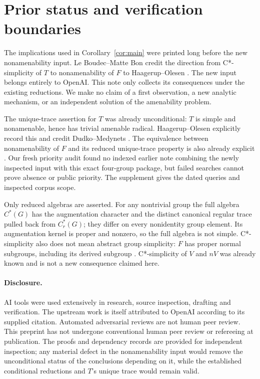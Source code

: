 \documentclass[11pt]{article}
\newcommand{\Cr}{C^*_r}
\begin{document}
\section{Prior status and verification boundaries}
The implications used in Corollary~\ref{cor:main} were printed long before the new nonamenability input. Le Boudec--Matte Bon credit the direction from C*-simplicity of $T$ to nonamenability of $F$ to Haagerup--Olesen \cite[Theorem~5.5]{HO}. The new input belongs entirely to OpenAI. This note only collects its consequences under the existing reductions. We make no claim of a first observation, a new analytic mechanism, or an independent solution of the amenability problem.

The unique-trace assertion for $T$ was already unconditional: $T$ is simple and nonamenable, hence has trivial amenable radical. Haagerup--Olesen explicitly record this and credit Dudko--Medynets \cite[discussion after Theorem~5.5]{HO}. The equivalence between nonamenability of $F$ and its reduced unique-trace property is also already explicit \cite[Remark~5.6]{HO}. Our fresh priority audit found no indexed earlier note combining the newly inspected input with this exact four-group package, but failed searches cannot prove absence or public priority. The supplement gives the dated queries and inspected corpus scope.

Only reduced algebras are asserted. For any nontrivial group the full algebra $C^*(G)$ has the augmentation character and the distinct canonical regular trace pulled back from $\Cr(G)$; they differ on every nonidentity group element. Its augmentation kernel is proper and nonzero, so the full algebra is not simple. C*-simplicity also does not mean abstract group simplicity: $F$ has proper normal subgroups, including its derived subgroup \cite{CFP}. C*-simplicity of $V$ and $nV$ was already known \cite[Theorems~1.5 and 4.5]{LMB} and is not a new consequence claimed here.

\paragraph{Disclosure.} AI tools were used extensively in research, source inspection, drafting and verification. The upstream work is itself attributed to OpenAI according to its supplied citation. Automated adversarial reviews are not human peer review. This preprint has not undergone conventional human peer review or refereeing at publication. The proofs and dependency records are provided for independent inspection; any material defect in the nonamenability input would remove the unconditional status of the conclusions depending on it, while the established conditional reductions and $T$'s unique trace would remain valid.
\end{document}
